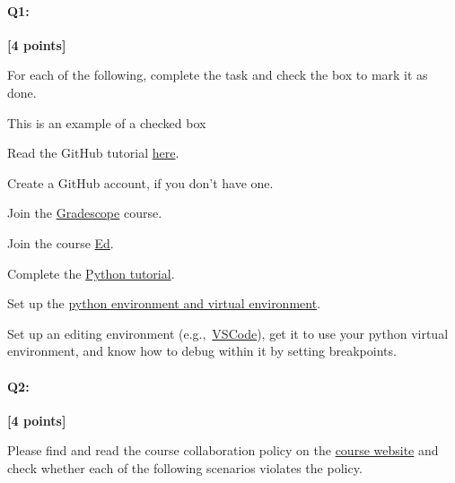 \documentclass[11pt]{article}
\newcommand{\cmark}{\ding{51}}%
\newcommand{\done}{\rlap{$\square$}{\raisebox{2pt}{\large\hspace{1pt}\cmark}}%
\hspace{-2.5pt}}
\begin{document}
\pagebreak


\paragraph{Q1:} \textbf{[4 points]}
\begin{tcolorbox}[colback=orange!5!white,colframe=orange!75!black]
For each of the following, complete the task and check the box to mark it as done.
\end{tcolorbox}


\begin{tcolorbox}[colback=white!5!white,colframe=green!75!black]

\begin{todolist}
    \item[\done] This is an example of a checked box
    \item Read the GitHub tutorial \href{https://browncsci1430.github.io/webpage/resources/github_guide/}{here}.
    \item Create a GitHub account, if you don't have one.
    \item Join the \href{https://www.gradescope.com/}{Gradescope} course.
    \item Join the course \href{https://edstem.org/us/courses/28039/discussion/}{Ed}.
    \item Complete the \href{https://browncsci1430.github.io/webpage/resources/python_tutorial/}{Python tutorial}.
    \item Set up the \href{https://browncsci1430.github.io/webpage/resources/python_setup/}{python environment and virtual environment}.
    \item Set up an editing environment (e.g.,~\href{https://browncsci1430.github.io/webpage/resources/vscode_setup/}{VSCode}), get it to use your python virtual environment, and know how to debug within it by setting breakpoints.
\end{todolist}
\end{tcolorbox}

\pagebreak

\paragraph{Q2:} 
\textbf{[4 points]}
\begin{tcolorbox}[colback=orange!5!white,colframe=orange!75!black]
Please find and read the course collaboration policy on the \href{https://browncsci1430.github.io/webpage/}{course website} and check whether each of the following scenarios violates the policy.
\end{tcolorbox}
\end{document}
